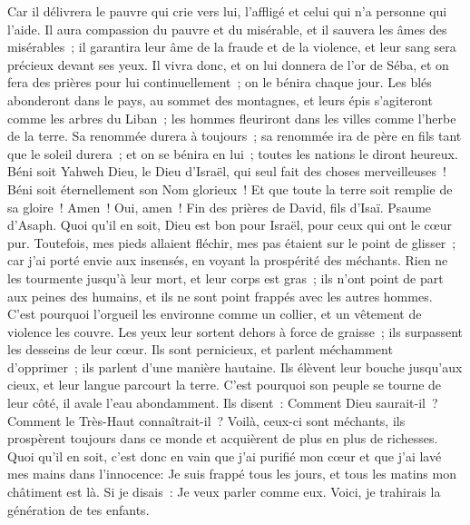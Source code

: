 \begin{multicols}{2}
Car il délivrera le pauvre qui crie vers lui, l'affligé et celui qui n'a personne qui l'aide.
Il aura compassion du pauvre et du misérable, et il sauvera les âmes des misérables~;
il garantira leur âme de la fraude et de la violence, et leur sang sera précieux devant ses yeux.
Il vivra donc, et on lui donnera de l'or de Séba, et on fera des prières pour lui continuellement~; on le bénira chaque jour.
Les blés abonderont dans le pays, au sommet des montagnes, et leurs épis s'agiteront comme les arbres du Liban~; les hommes fleuriront dans les villes comme l'herbe de la terre.
Sa renommée durera à toujours~; sa renommée ira de père en fils tant que le soleil durera~; et on se bénira en lui~; toutes les nations le diront heureux.
Béni soit Yahweh Dieu, le Dieu d'Israël, qui seul fait des choses merveilleuses~!
Béni soit éternellement son Nom glorieux~! Et que toute la terre soit remplie de sa gloire~! Amen~! Oui, amen~!
Fin des prières de David, fils d'Isaï.
\VerseOne{}Psaume d'Asaph. Quoi qu'il en soit, Dieu est bon pour Israël, pour ceux qui ont le cœur pur.
Toutefois, mes pieds allaient fléchir, mes pas étaient sur le point de glisser~;
car j'ai porté envie aux insensés, en voyant la prospérité des méchants.
Rien ne les tourmente jusqu'à leur mort, et leur corps est gras~;
ils n'ont point de part aux peines des humains, et ils ne sont point frappés avec les autres hommes.
C'est pourquoi l'orgueil les environne comme un collier, et un vêtement de violence les couvre.
Les yeux leur sortent dehors à force de graisse~; ils surpassent les desseins de leur cœur.
Ils sont pernicieux, et parlent méchamment d'opprimer~; ils parlent d'une manière hautaine.
Ils élèvent leur bouche jusqu'aux cieux, et leur langue parcourt la terre.
C'est pourquoi son peuple se tourne de leur côté, il avale l'eau abondamment.
Ils disent~: Comment Dieu saurait-il~? Comment le Très-Haut connaîtrait-il~?
Voilà, ceux-ci sont méchants, ils prospèrent toujours dans ce monde et acquièrent de plus en plus de richesses.
Quoi qu'il en soit, c'est donc en vain que j'ai purifié mon cœur et que j'ai lavé mes mains dans l'innocence:
Je suis frappé tous les jours, et tous les matins mon châtiment est là.
Si je disais~: Je veux parler comme eux. Voici, je trahirais la génération de tes enfants.

\end{multicols}
